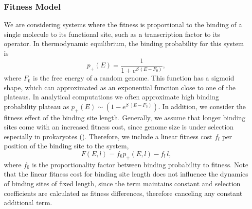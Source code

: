 \subsubsection*{Fitness Model}
    We are considering systems where the fitness is proportional to the binding of a single molecule to its functional site, such as a transcription factor to its operator. In thermodynamic equilibrium, the binding probability for this system is \cite{lassig_biophysics_2007}
	\begin{equation}
		p_+(E)=\frac{1}{1+e^{\beta\,(E-F_0)}},
    \end{equation}
    where $F_0$ is the free energy of a random genome. This function has a sigmoid shape, which can approximated as an exponential function close to one of the plateaus. In analytical computations we often approximate high binding probability plateau as $p_+(E) \sim (1-e^{\beta\,(E-F_0)})$. In addition, we consider the fitness effect of the binding site length. Generally, we assume that longer binding sites come with an increased fitness cost, since genome size is under selection especially in prokaryotes (). Therefore, we include a linear fitness cost $f_l$ per position of the binding site to the system,
    \begin{equation}
        F(E,l) = f_0p_+(E,l)-f_l\,l,\label{equ:fitness_function}
    \end{equation}
    where $f_0$ is the proportionality factor between binding probability to fitness. Note that the linear fitness cost for binding site length does not influence the dynamics of binding sites of fixed length, since the term maintains constant and selection coefficients are calculated as fitness differences, therefore canceling any constant additional term.

